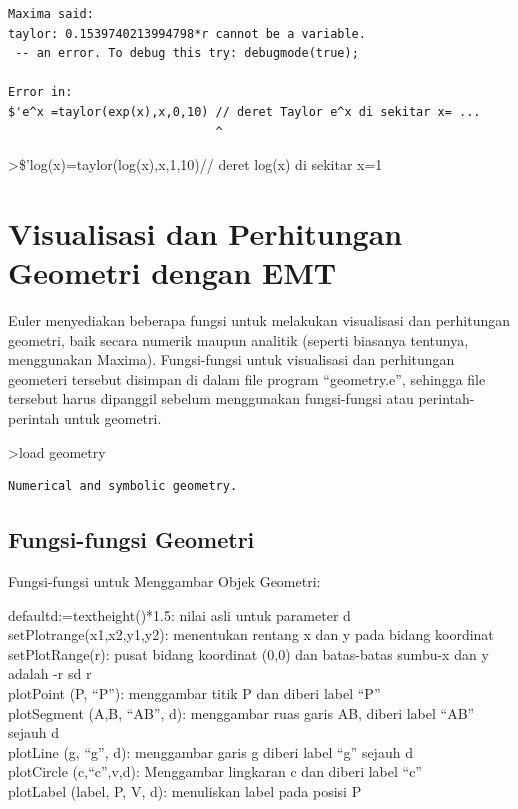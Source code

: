 \documentclass[
]{book}
\begin{document}
\begin{verbatim}
Maxima said:
taylor: 0.1539740213994798*r cannot be a variable.
 -- an error. To debug this try: debugmode(true);

Error in:
$'e^x =taylor(exp(x),x,0,10) // deret Taylor e^x di sekitar x= ...
                             ^
\end{verbatim}

\textgreater\$'log(x)=taylor(log(x),x,1,10)// deret log(x) di sekitar x=1

\chapter{Visualisasi dan Perhitungan Geometri dengan EMT}\label{visualisasi-dan-perhitungan-geometri-dengan-emt}

Euler menyediakan beberapa fungsi untuk melakukan visualisasi dan perhitungan geometri, baik secara numerik maupun analitik (seperti biasanya tentunya, menggunakan Maxima). Fungsi-fungsi untuk visualisasi dan perhitungan geometeri tersebut disimpan di dalam file program ``geometry.e'', sehingga file tersebut harus dipanggil sebelum menggunakan fungsi-fungsi atau perintah-perintah untuk geometri.

\textgreater load geometry

\begin{verbatim}
Numerical and symbolic geometry.
\end{verbatim}

\section{Fungsi-fungsi Geometri}\label{fungsi-fungsi-geometri}

Fungsi-fungsi untuk Menggambar Objek Geometri:

defaultd:=textheight()*1.5: nilai asli untuk parameter d\\
setPlotrange(x1,x2,y1,y2): menentukan rentang x dan y pada bidang koordinat\\
setPlotRange(r): pusat bidang koordinat (0,0) dan batas-batas sumbu-x dan y adalah -r sd r\\
plotPoint (P, ``P''): menggambar titik P dan diberi label ``P''\\
plotSegment (A,B, ``AB'', d): menggambar ruas garis AB, diberi label ``AB'' sejauh d\\
plotLine (g, ``g'', d): menggambar garis g diberi label ``g'' sejauh d\\
plotCircle (c,``c'',v,d): Menggambar lingkaran c dan diberi label ``c''\\
plotLabel (label, P, V, d): menuliskan label pada posisi P
\end{document}
